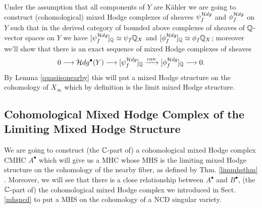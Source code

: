 \documentclass[../main.tex]{subfiles}
\begin{document}
Under the assumption that all components of $Y$ are K\"ahler we are going to construct (cohomological) mixed Hodge complexes of sheaves $\psi_f^{\mathcal{H} dg}$ and $\phi_f^{\mathcal{H} dg}$ on $Y$ such that in the derived category of bounded above complexes of sheaves of $\mathbb{Q}$-vector spaces on $Y$ we have $[\psi^{\mathcal{H} dg}_f]_{\mathbb{Q}} \simeq \psi_f \mathbb{Q}_X$ and $[\phi^{\mathcal{H} dg}_f]_{\mathbb{Q}} \simeq \phi_f \mathbb{Q}_X$; moreover we’ll show that there is an exact sequence of mixed Hodge complexes of sheaves
\[
0 \longrightarrow \mathcal{H} dg^\bullet(Y) \longrightarrow [\psi^{\mathcal{H} dg}_f]_{\mathbb{Q}} \xrightarrow{can} [\phi^{\mathcal{H} dg}_f]_{\mathbb{Q}} \longrightarrow 0 .
\]
By Lemma \ref{quasiisonearby} this will put a mixed Hodge structure on the cohomology of $X_\infty$ which by definition is the limit mixed Hodge structure.



\subsection{Cohomological Mixed Hodge Complex of the Limiting Mixed Hodge Structure} \label{Sect.CMHC.LMHS}

We are going to construct (the $\mathbb{C}$-part of) a cohomological mixed Hodge complex CMHC $A^\bullet$ which will give us a MHC whose MHS is the limiting mixed Hodge structure on the cohomology of the nearby fiber, as defined by Thm. \ref{limmhsthm} . Moreover, we will see that there is a close relationship between $A^{\bullet}$ and $B^{\bullet}$, (the $\mathbb{C}$-part of) the cohomological mixed Hodge complex  we introduced in Sect. \ref{mhsncd} to put a MHS on the cohomology of a NCD singular variety. 
\end{document}
